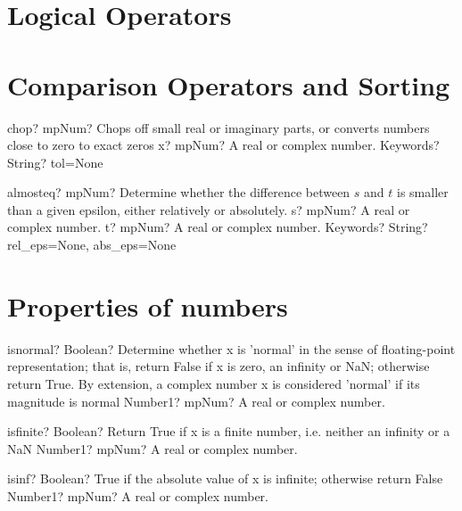\documentclass[12pt,a4paper,openany]{book}
\begin{document}
\section{Logical Operators }

\section{Comparison Operators and Sorting}

\begin{mpFunctionsExtract}
\mpFunctionTwo
{chop? mpNum? Chops off small real or imaginary parts, or converts numbers close to zero to exact zeros}
{x? mpNum? A real or complex number.}
{Keywords? String? tol=None}
\end{mpFunctionsExtract}

\begin{mpFunctionsExtract}
\mpFunctionThree
{almosteq? mpNum? Determine whether the difference between $s$ and $t$ is smaller than a given epsilon, either relatively or absolutely.}
{s? mpNum? A real or complex number.}
{t? mpNum? A real or complex number.}
{Keywords? String? rel\_eps=None, abs\_eps=None}
\end{mpFunctionsExtract}

\section{Properties of numbers}

\begin{mpFunctionsExtract}
\mpFunctionOne
{isnormal? Boolean?  Determine whether x is 'normal' in the sense of floating-point representation; that is, return False if x is zero, an infinity or NaN; otherwise return True. By extension, a complex number x is considered 'normal' if its magnitude is normal}
{Number1? mpNum? A real or complex number.}
\end{mpFunctionsExtract}

\begin{mpFunctionsExtract}
\mpFunctionOne
{isfinite? Boolean?  Return True if x is a finite number, i.e. neither an infinity or a NaN}
{Number1? mpNum? A real or complex number.}
\end{mpFunctionsExtract}

\begin{mpFunctionsExtract}
\mpFunctionOne
{isinf? Boolean?  True if the absolute value of x is infinite; otherwise return False}
{Number1? mpNum? A real or complex number.}
\end{mpFunctionsExtract}
\end{document}
